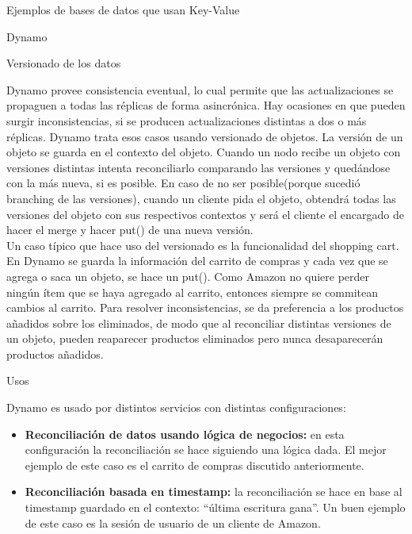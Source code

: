 \begin{section}{Ejemplos de bases de datos que usan Key-Value}
\begin{subsection}{Dynamo}
\begin{subsubsection}{Versionado de los datos}

Dynamo provee consistencia eventual, lo cual permite que las actualizaciones se propaguen a todas las réplicas de forma asincrónica. Hay ocasiones en que pueden surgir inconsistencias, si se producen actualizaciones distintas a dos o más réplicas. Dynamo trata esos casos usando versionado de objetos. La versión de un objeto se guarda en el contexto del objeto. Cuando un nodo recibe un objeto con versiones distintas intenta reconciliarlo comparando las versiones y quedándose con la más nueva, si es posible. En caso de no ser posible(porque sucedió branching de las versiones), cuando un cliente pida el objeto, obtendrá todas las versiones del objeto con sus respectivos contextos y será el cliente el encargado de hacer el merge y hacer put() de una nueva versión.\\

	Un caso típico que hace uso del versionado es la funcionalidad del shopping cart. En Dynamo se guarda la información del carrito de compras y cada vez que se agrega o saca un objeto, se hace un put(). Como Amazon no quiere perder ningún ítem que se haya agregado al carrito, entonces siempre se commitean cambios al carrito. Para resolver inconsistencias, se da preferencia a los productos añadidos sobre los eliminados, de modo que al reconciliar distintas versiones de un objeto, pueden reaparecer productos eliminados pero nunca desaparecerán productos añadidos.\\
	
\end{subsubsection}

\begin{subsubsection}{Usos}

	Dynamo es usado por distintos servicios con distintas configuraciones:\\
\begin{itemize}

\item \textbf{Reconciliación de datos usando lógica de negocios:} en esta configuración la reconciliación se hace siguiendo una lógica dada. El mejor ejemplo de este caso es el carrito de compras discutido anteriormente.\\

\item \textbf{Reconciliación basada en timestamp:} la reconciliación se hace en base al timestamp guardado en el contexto: “última escritura gana”. Un buen ejemplo de este caso es la sesión de usuario de un cliente de Amazon.\\


\end{itemize}
\end{subsubsection}
\end{subsection}
\end{section}

